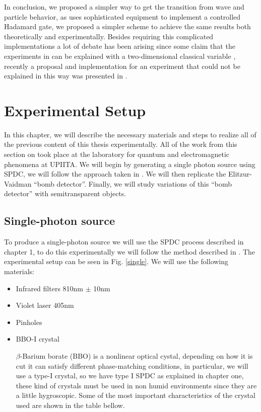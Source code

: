 \documentclass[12pt]{book}
\begin{document}
In conclusion, we proposed a simpler way to get the transition from wave and particle behavior, as \cite{Kaiser2012,Peruzzo} uses sophisticated equipment to implement a controlled Hadamard gate, we proposed a simpler scheme to achieve the same results both theoretically and experimentally. Besides requiring this complicated implementations a lot of debate has been arising since some claim that the experiments in \cite{Peruzzo,Kaiser2012}  can be explained with a two-dimensional classical variable \cite{Rossi,Chaves}, recently a proposal and implementation for an experiment that could not be explained in this way was presented in \cite{Polino}.

\chapter{Experimental Setup}
In this chapter, we will describe the necessary materials and steps to realize all of the previous content of this thesis experimentally. All of the work from this section on took place at the laboratory for quantum and electromagnetic phenomena at UPIITA. We will begin by generating a single photon source using SPDC, we will follow the approach taken in \cite{maestria_procopio}. We will then replicate the Elitzur-Vaidman ``bomb detector''. Finally, we will study variations of this ``bomb detector'' with semitransparent objects.

\section{Single-photon source}


To produce a single-photon source we will use the SPDC process described in chapter 1, to do this experimentally we will follow the method described in \cite{maestria_procopio}. The experimental setup can be seen in Fig. \ref{single}.  We will use the following materials:



\begin{itemize}


\item Infrared filters 810nm $\pm$ 10nm
\item Violet laser 405nm
\item Pinholes
\item BBO-I crystal

$\beta$-Barium borate (BBO) is a nonlinear optical cystal, depending on how it is cut it can satisfy different phase-matching conditions, in particular, we will use a type-I crystal, so we have type I SPDC as explained in chapter one, these kind of crystals must be used in non humid environments since they are a little hygroscopic. Some of the most important characteristics of the crystal used are shown in the table bellow.
 
\end{itemize}
\end{document}
